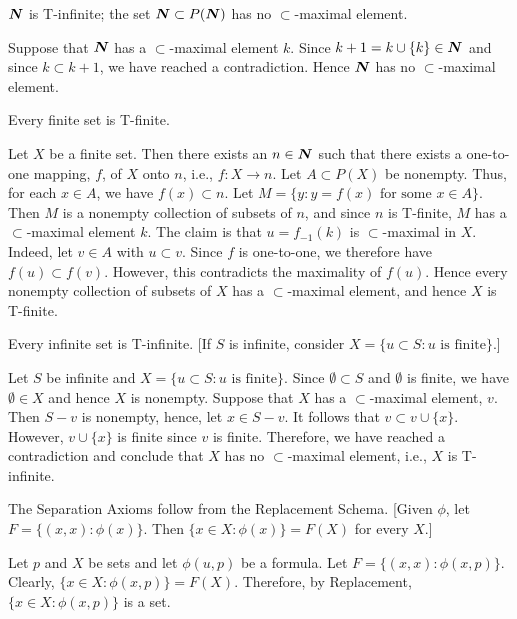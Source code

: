  $\boldsymbol{N}$ is T-infinite; the set $\boldsymbol{N} \subset P(\boldsymbol{N})$ has no 
$\subset$-maximal element.
\begin{solution}
  Suppose that $\boldsymbol{N}$ has a $\subset$-maximal element $k$. Since 
  $k + 1 = k \cup \{ k \} \in \boldsymbol{N}$ and since $k \subset k + 1$, we have reached a 
  contradiction. Hence $\boldsymbol{N}$ has no $\subset$-maximal element.
\end{solution}

 Every finite set is T-finite.
\begin{solution}
  Let $X$ be a finite set. Then there exists an $n \in \boldsymbol{N}$ such that there 
  exists a one-to-one mapping, $f$, of $X$ onto $n$, i.e., 
  $f : X \rightarrow n$. Let $A \subset P(X)$ be nonempty. Thus, for each 
  $x \in A$, we have $f(x) \subset n$. Let 
  $M = \{ y : y = f(x) \text{ for some } x \in A \}$. Then $M$ is a nonempty 
  collection of subsets of $n$, and since $n$ is T-finite, $M$ has a 
  $\subset$-maximal element $k$. The claim is that $u = f_{-1}(k)$ is 
  $\subset$-maximal in $X$. Indeed, let $v \in A$ with $u \subset v$. Since 
  $f$ is one-to-one, we therefore have $f(u) \subset f(v)$. However, this 
  contradicts the maximality of $f(u)$. Hence every nonempty collection of 
  subsets of $X$ has a $\subset$-maximal element, and hence $X$ is T-finite.
\end{solution}

 Every infinite set is T-infinite. [If $S$ is infinite, consider 
$X = \{ u \subset S : u \text{ is finite} \}$.]
\begin{solution}
  Let $S$ be infinite and $X = \{ u \subset S : u \text{ is finite}\}$. Since 
  $\emptyset \subset S$ and $\emptyset$ is finite, we have $\emptyset \in X$ 
  and hence $X$ is nonempty. Suppose that $X$ has a $\subset$-maximal element, 
  $v$. Then $S - v$ is nonempty, hence, let $x \in S - v$. It follows that 
  $v \subset v \cup \{ x \}$. However, $v \cup \{ x \}$ is finite since $v$ is 
  finite. Therefore, we have reached a contradiction and conclude that $X$ has 
  no $\subset$-maximal element, i.e., $X$ is T-infinite.
\end{solution}

 The Separation Axioms follow from the Replacement Schema. [Given 
$\phi$, let $F = \{ ( x, x ) : \phi(x) \}$. Then 
$\{ x \in X : \phi(x) \} = F(X)$ for every $X$.]
\begin{solution}
  Let $p$ and $X$ be sets and let $\phi(u, p)$ be a formula. Let 
  $F = \{ ( x, x ) : \phi(x, p) \}$. Clearly, 
  $\{ x \in X : \phi(x, p) \} = F(X)$. Therefore, by Replacement, 
  $\{ x \in X : \phi(x, p) \}$ is a set.
\end{solution}

